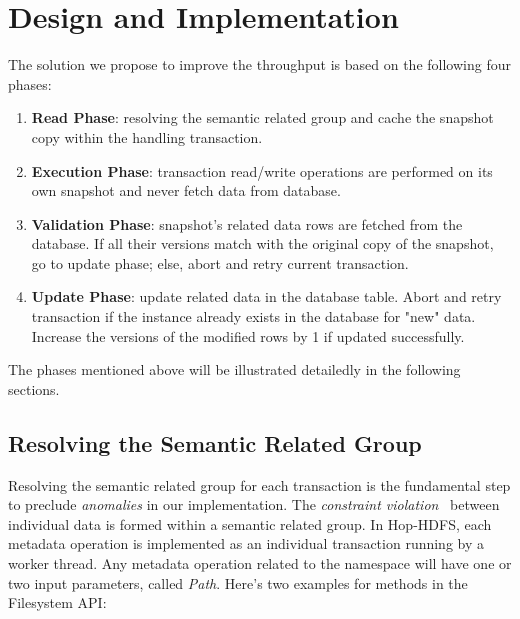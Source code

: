 
%
%


\chapter{Design and Implementation}
The solution we propose to improve the throughput is based on the following four phases:
\begin{enumerate}[noitemsep]
	\item \textbf{Read Phase}: resolving the semantic related group and cache the snapshot copy within the handling transaction.
	\item \textbf{Execution Phase}: transaction read/write operations are performed on its own snapshot and never fetch data from database.
	\item \textbf{Validation Phase}: snapshot's related data rows are fetched from the database. If all their versions match with the original copy of the snapshot, go to update phase; else, abort and retry current transaction.
	\item \textbf{Update Phase}: update related data in the database table. Abort and retry transaction if the instance already exists in the database for "new" data. Increase the versions of the modified rows by 1 if updated successfully.
\end{enumerate}
\label{ch:Design}

\noindent The phases mentioned above will be illustrated detailedly in the following sections.
\section{Resolving the Semantic Related Group}

Resolving the semantic related group for each transaction is the fundamental step to preclude \textit{anomalies} in our implementation. The \textit{constraint violation}~\cite{berenson1995critique} between individual data is formed within a semantic related group. In Hop-HDFS, each metadata operation is implemented as an individual transaction running by a worker thread. Any metadata operation related to the namespace will have one or two input parameters, called \textit{Path}. Here's two examples for methods in the Filesystem API:

